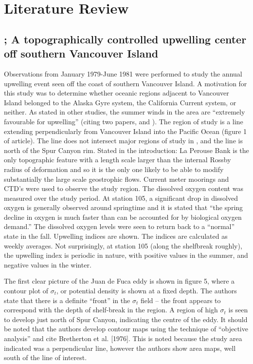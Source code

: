 \documentclass[12pt]{extreport}
\begin{document}
\section{Literature Review}

\subsection{\cite{freeland1982topographically}; A topographically controlled upwelling center off southern Vancouver Island}

Observations from January 1979-June 1981 were performed to study the annual upwelling event seen off the coast of southern Vancouver Island. A motivation for this study was to determine whether oceanic regions adjacent to Vancouver Island belonged to the Alaska Gyre system, the California Current system, or neither. As stated in other studies, the summer winds in the area are ``extremely favourable for upwelling'' (citing two papers, \cite{bakun1975daily} and \cite{nelson1977wind}). The region of study is a line extending perpendicularly from Vancouver Island into the Pacific Ocean (figure 1 of article). The line does not intersect major regions of study in \cite{foreman2008modeling}, and the line is north of the Spur Canyon rim. Stated in the introduction: La Perouse Bank is the only topographic feature with a length scale larger than the internal Rossby radius of deformation and so it is the only one likely to be able to modify substantially the large scale geostrophic flows. Current meter moorings and CTD's were used to observe the study region. The dissolved oxygen content was measured over the study period. At station 105, a significant drop in dissolved oxygen is generally observed around springtime and it is stated that ``the spring decline in oxygen is much faster than can be accounted for by biological oxygen demand.'' The dissolved oxygen levels were seen to return back to a ``normal'' state in the fall. Upwelling indices are shown. The indices are calculated as weekly averages. Not surprisingly, at station 105 (along the shelfbreak roughly), the upwelling index is periodic in nature, with positive values in the summer, and negative values in the winter.

The first clear picture of the Juan de Fuca eddy is shown in figure 5, where a contour plot of $\sigma_t$, or potential density is shown at a fixed depth. The authors state that there is a definite ``front'' in the $\sigma_t$ field -- the front appears to correspond with the depth of shelf-break in the region. A region of high $\sigma_t$ is seen to develop just north of Spur Canyon, indicating the centre of the eddy. It should be noted that the authors develop contour maps using the technique of ``objective analysis'' and cite Bretherton et al. [1976]. This is noted because the study area indicated was a perpendicular line, however the authors show area maps, well south of the line of interest.
\end{document}
